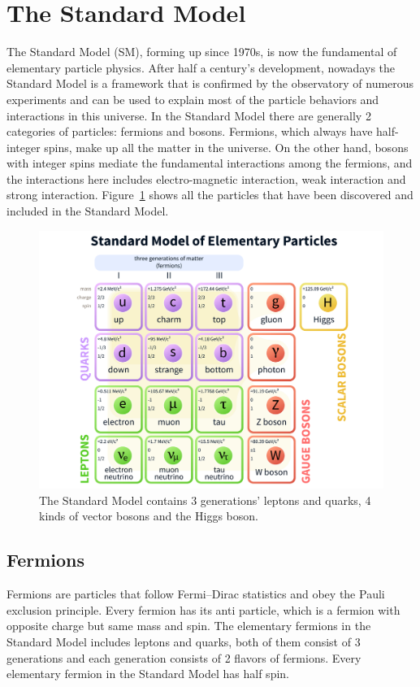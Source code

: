 
\section{The Standard Model}
The Standard Model (SM)\cite{SMref1,SMref2,SMref3}, forming up since 1970s, is now the fundamental of elementary particle physics. After half a century's development, nowadays the Standard Model is a framework that is confirmed by the observatory of numerous experiments and can be used to explain most of the particle behaviors and interactions in this universe. In the Standard Model there are generally 2 categories of particles: fermions and bosons. Fermions, which always have half-integer spins, make up all the matter in the universe. On the other hand, bosons with integer spins mediate the fundamental interactions among the fermions, and the interactions here includes electro-magnetic interaction, weak interaction and strong interaction. Figure~\ref{fig:smpfamily} shows all the particles that have been discovered and included in the Standard Model.
\begin{figure}[htbp]
\begin{center}
\includegraphics[width=0.72\linewidth]{figures/smpfamily.pdf}
\caption{The Standard Model contains 3 generations' leptons and quarks, 4 kinds of vector bosons and the Higgs boson.}
\label{fig:smpfamily}
\end{center}
\end{figure}

\subsection{Fermions}
Fermions are particles that follow Fermi–Dirac statistics and obey the Pauli exclusion principle. Every fermion has its anti particle, which is a fermion with opposite charge but same mass and spin. The elementary fermions in the Standard Model includes leptons and quarks, both of them consist of 3 generations and each generation consists of 2 flavors of fermions. Every elementary fermion in the Standard Model has half spin.
